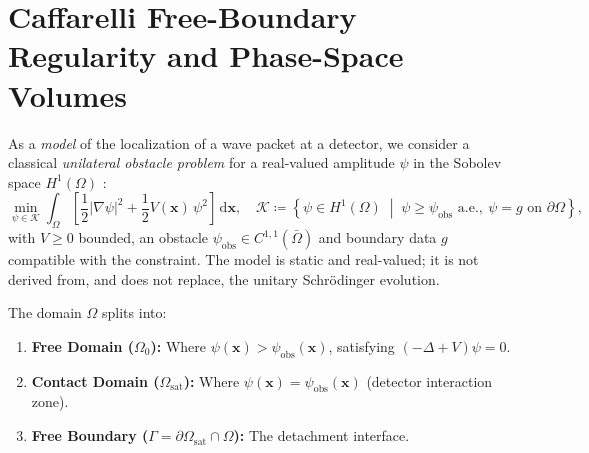 \documentclass[11pt,a4paper,reqno]{amsart}
\theoremstyle{definition}
\numberwithin{equation}{section}
\newcommand{\dif}{\,\mathrm{d}}
\begin{document}
\section{Caffarelli Free-Boundary Regularity and Phase-Space Volumes}
\label{sec:caffarelli_born}

As a \emph{model} of the localization of a wave packet at a detector, we consider a classical \emph{unilateral obstacle problem} for a real-valued amplitude $\psi$ in the Sobolev space $H^1(\Omega)$ \cite{caffarelli1998obstacle, kinderlehrer1980introduction}:
\begin{equation}
    \label{eq:obstacle_problem}
    \min_{\psi \in \mathcal{K}} \int_\Omega \left[ \frac{1}{2} |\nabla \psi|^2 + \frac{1}{2} V(\mathbf{x})\, \psi^2 \right] \dif \mathbf{x}, \quad \mathcal{K} \coloneqq \left\{ \psi \in H^1(\Omega) \;\middle|\; \psi \ge \psi_{\mathrm{obs}} \text{ a.e.},\ \psi = g \text{ on } \partial\Omega \right\},
\end{equation}
with $V \ge 0$ bounded, an obstacle $\psi_{\mathrm{obs}} \in C^{1,1}(\bar\Omega)$ and boundary data $g$ compatible with the constraint. The model is static and real-valued; it is not derived from, and does not replace, the unitary Schr\"odinger evolution.

The domain $\Omega$ splits into:
\begin{enumerate}
    \item \textbf{Free Domain ($\Omega_0$):} Where $\psi(\mathbf{x}) > \psi_{\mathrm{obs}}(\mathbf{x})$, satisfying $(-\Delta + V)\psi = 0$.
    \item \textbf{Contact Domain ($\Omega_{\mathrm{sat}}$):} Where $\psi(\mathbf{x}) = \psi_{\mathrm{obs}}(\mathbf{x})$ (detector interaction zone).
    \item \textbf{Free Boundary ($\Gamma = \partial \Omega_{\mathrm{sat}} \cap \Omega$):} The detachment interface.
\end{enumerate}
\end{document}
